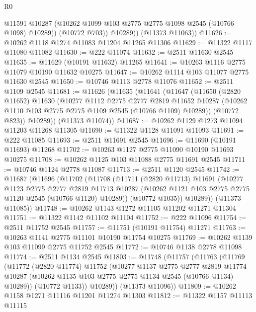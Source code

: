 \begin{lexlean}{R0}
\begin{coremodule}
              @11591
              @10287
              (@10262 @1099 @103 @2775 @2775 @1098 @2545 (@10766 @1098) @10289))
            (@10772 @703))
          @10289))
      (@11373 @11063))
@11626 := @10262 @1118 @1274 @11083 @11204 @11265 @11306
@11629 := @11322 @1117 @11080 @11082
@11630 := @222 @11074
@11632 := @2511 @11630 @2545
@11635 := @11629 (@10191 @11632) @11265
@11641 := @10263 @1116 @2775 @11079 @10190 @11632 @10275
@11647 := @10262 @1114 @103 @11077 @2775 @11630 @2545
@11650 := @10746 @1113 @2778 @11076
@11652 := @2511 @1109 @2545
@11681 := @11626
    (@11635
      (@11641
        (@11647
          (@11650
            (@2820 @11652)
            @11630
            (@10277
              @1112
              @2775
              @2777
              @2819
              @11652
              @10287
              (@10262 @1110 @103 @2775 @2775 @1109 @2545 (@10766 @1109) @10289))
            (@10772 @823))
          @10289))
      (@11373 @11074))
@11687 := @10262 @1129 @1273 @11094 @11203 @11268 @11305
@11690 := @11322 @1128 @11091 @11093
@11691 := @222 @11085
@11693 := @2511 @11691 @2545
@11696 := @11690 (@10191 @11693) @11268
@11702 := @10263 @1127 @2775 @11090 @10190 @11693 @10275
@11708 := @10262 @1125 @103 @11088 @2775 @11691 @2545
@11711 := @10746 @1124 @2778 @11087
@11713 := @2511 @1120 @2545
@11742 := @11687
    (@11696
      (@11702
        (@11708
          (@11711
            (@2820 @11713)
            @11691
            (@10277
              @1123
              @2775
              @2777
              @2819
              @11713
              @10287
              (@10262 @1121 @103 @2775 @2775 @1120 @2545 (@10766 @1120) @10289))
            (@10772 @1035))
          @10289))
      (@11373 @11085))
@11748 := @10262 @1143 @1272 @11105 @11202 @11271 @11304
@11751 := @11322 @1142 @11102 @11104
@11752 := @222 @11096
@11754 := @2511 @11752 @2545
@11757 := @11751 (@10191 @11754) @11271
@11763 := @10263 @1141 @2775 @11101 @10190 @11754 @10275
@11769 := @10262 @1139 @103 @11099 @2775 @11752 @2545
@11772 := @10746 @1138 @2778 @11098
@11774 := @2511 @1134 @2545
@11803 := @11748
    (@11757
      (@11763
        (@11769
          (@11772
            (@2820 @11774)
            @11752
            (@10277
              @1137
              @2775
              @2777
              @2819
              @11774
              @10287
              (@10262 @1135 @103 @2775 @2775 @1134 @2545 (@10766 @1134) @10289))
            (@10772 @1133))
          @10289))
      (@11373 @11096))
@11809 := @10262 @1158 @1271 @11116 @11201 @11274 @11303
@11812 := @11322 @1157 @11113 @11115

\end{coremodule}
\end{lexlean}
